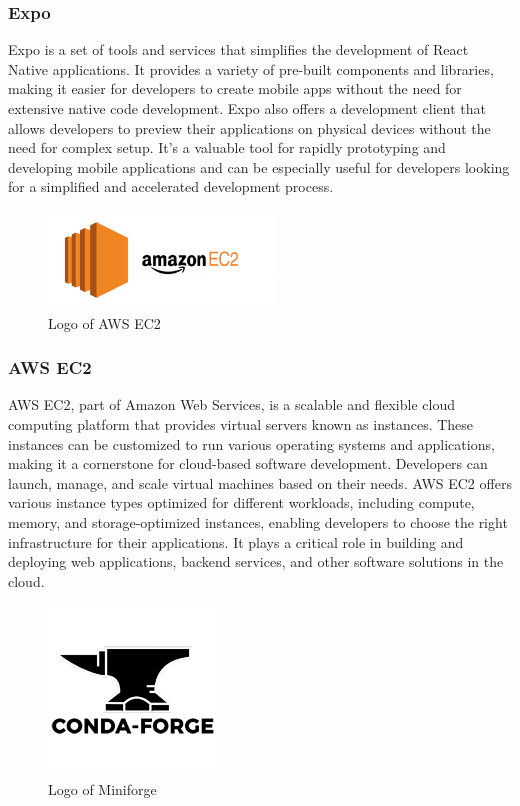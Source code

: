 \documentclass[conference]{IEEEtran}
\begin{document}
        \subsubsection{Expo}
        Expo is a set of tools and services that simplifies the development of React Native applications. It provides a variety of pre-built components and libraries, making it easier for developers to create mobile apps without the need for extensive native code development. Expo also offers a development client that allows developers to preview their applications on physical devices without the need for complex setup. It's a valuable tool for rapidly prototyping and developing mobile applications and can be especially useful for developers looking for a simplified and accelerated development process.\\

        \begin{figure}[htbp]
        \centerline{\includegraphics[width=6cm]{Images/logo/aws.png}}
        \label{fig}
        \caption{Logo of AWS EC2}
        \end{figure}
        \subsubsection{AWS EC2}
        AWS EC2, part of Amazon Web Services, is a scalable and flexible cloud computing platform that provides virtual servers known as instances. These instances can be customized to run various operating systems and applications, making it a cornerstone for cloud-based software development. Developers can launch, manage, and scale virtual machines based on their needs. AWS EC2 offers various instance types optimized for different workloads, including compute, memory, and storage-optimized instances, enabling developers to choose the right infrastructure for their applications. It plays a critical role in building and deploying web applications, backend services, and other software solutions in the cloud.\\
        \newpage
        \begin{figure}[htbp]
        \centerline{\includegraphics[width=4.5cm]{Images/logo/forge.png}}
        \label{fig}
        \caption{Logo of Miniforge}
        \end{figure}
\end{document}
